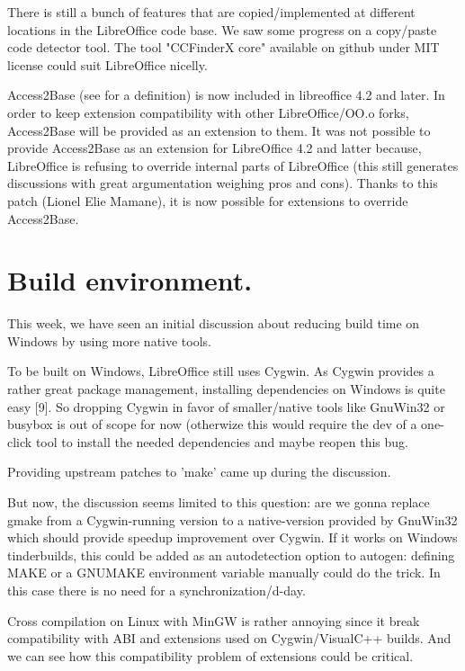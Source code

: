 \documentclass{article}
\begin{document}
There is still a bunch of features that are copied/implemented at different
locations in the LibreOffice code base. We saw some progress on a copy/paste
code detector tool\cite{copyPasteDetectorBug}. The tool "CCFinderX core"
available on github under MIT license could suit LibreOffice
nicelly\cite{copyPasteDetectorGithub}.

Access2Base (see \cite{access2BaseDefinition} for a definition) is now included
in libreoffice 4.2 and later. In order to keep extension compatibility with
other LibreOffice/OO.o forks, Access2Base will be provided as an extension to
them. It was not possible to provide Access2Base as an extension for
LibreOffice 4.2 and latter because, LibreOffice is refusing to override
internal parts of LibreOffice (this still generates discussions with great
argumentation weighing pros and cons\cite{coreOverrideArguments}). Thanks to
this patch\cite{access2BaseOverridePatch} (Lionel Elie Mamane), it is now
possible for extensions to override Access2Base.



\section{Build environment.}

This week, we have seen an initial discussion about reducing build time on
Windows by using more native tools.

To be built on Windows, LibreOffice still uses Cygwin. As Cygwin provides
a rather great package management, installing dependencies on Windows is quite
easy [9]. So dropping Cygwin in favor of smaller/native tools like GnuWin32 or
busybox is out of scope for now (otherwize this would require the dev of
a one-click tool to install the needed
dependencies\cite{winBuildDependenciesTool} and maybe reopen this
bug\cite{winBuildDependenciesInstall}.

Providing upstream patches to 'make' came up during the discussion.

But now, the discussion seems limited to this question: are we gonna replace
gmake from a Cygwin-running version to a native-version provided by GnuWin32
which should provide speedup improvement over Cygwin. If it works on Windows
tinderbuilds, this could be added as an autodetection option to autogen:
defining MAKE or a GNUMAKE environment variable manually could do the trick. In
this case there is no need for
a synchronization/d-day\cite{winBuildGmakeReplaceGnuWin32}.

Cross compilation on Linux with MinGW is rather annoying since it break
compatibility with ABI and extensions used on Cygwin/VisualC++ builds. And we
can see how this compatibility problem of extensions could be
critical\cite{extensionsCompatibility}.
\end{document}

